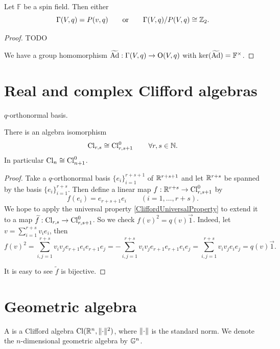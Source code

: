 \begin{proposition}
Let $\mathbb{F}$ be a spin field. Then either
\[ \Gamma(V,q)=P(v,q) \qquad \text{or} \qquad \Gamma(V,q)/P(V,q) \cong \mathbb{Z}_2. \]
\end{proposition}
\begin{proof}
TODO

We have a group homomorphism $\widetilde{\operatorname{Ad}}: \Gamma(V,q)\to \operatorname{O}(V,q)$ with $\ker(\widetilde{\operatorname{Ad}}) = \mathbb{F}^\times$. 
\end{proof}

\section{Real and complex Clifford algebras}

\begin{definition}
$q$-orthonormal basis.
\end{definition}

\begin{proposition}
There is an algebra isomorphism
\[ \operatorname{Cl}_{r,s} \cong \operatorname{Cl}^0_{r,s+1} \qquad \forall r,s\in\mathbb{N}. \]
In particular $\operatorname{Cl}_n \cong \operatorname{Cl}^0_{n+1}$.
\end{proposition}
\begin{proof}
Take a $q$-orthonormal basis $\{e_i\}_{i=1}^{r+s+1}$ of $\mathbb{R}^{r+s+1}$ and let $\mathbb{R}^{r+s}$ be spanned by the basis $\{e_i\}_{i=1}^{r+s}$. Then define a linear map $f:\mathbb{R}^{r+s}\to \operatorname{Cl}^0_{r,s+1}$ by
\[ f(e_i) = e_{r+s+1}e_i \qquad (i=1,\ldots,r+s). \]
We hope to apply the universal property \ref{CliffordUniversalProperty} to extend it to a map $\widetilde{f}: \operatorname{Cl}_{r,s}\to \operatorname{Cl}^0_{r,s+1}$. So we check $f(v)^2 = q(v) \vec{1}$. Indeed, let $v = \sum_{i=1}^{r+s}v_ie_i$, then
\[ f(v)^2 = \sum_{i,j=1}^{r+s}v_iv_je_{r+1}e_ie_{r+1}e_j = -\sum_{i,j=1}^{r+s}v_iv_je_{r+1}e_{r+1}e_ie_j = \sum_{i,j=1}^{r+s}v_iv_je_ie_j = q(v) \vec{1}. \]

It is easy to see $\widetilde{f}$ is bijective.
\end{proof}


\section{Geometric algebra}
\begin{definition}
A  is a Clifford algebra $\operatorname{Cl}(\mathbb{R}^n, \lVert\cdot\rVert^2)$, where $\lVert\cdot\rVert$ is the standard norm. We denote the $n$-dimensional geometric algebra by $\mathbb{G}^n$.
\end{definition}

